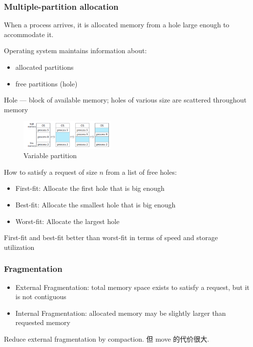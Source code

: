 \subsubsection{Multiple-partition allocation}
When a process arrives, it is allocated memory from a hole large enough to accommodate it. 

Operating system maintains information about:
\begin{itemize}
    \item allocated partitions
    \item free partitions (hole)
\end{itemize}

Hole --- block of available memory; holes of various size are
scattered throughout memory

\begin{figure}[!htb]
    \centering
    \includegraphics[width=0.42\textwidth]{pic/OS8/Variable partition}
    \caption{Variable partition}
\end{figure}

How to satisfy a request of size $n$ from a list of free holes:
\begin{itemize}\small
    \item First-fit: Allocate the first hole that is big enough
    \item Best-fit: Allocate the smallest hole that is big enough
    \item Worst-fit: Allocate the largest hole
\end{itemize}
First-fit and best-fit better than worst-fit in terms of speed and storage utilization

\subsubsection{Fragmentation}
\begin{itemize}
    \item External Fragmentation: total memory space exists to satisfy a
    request, but it is not contiguous
    \item Internal Fragmentation: allocated
    memory may be slightly larger than requested memory
\end{itemize}

Reduce external fragmentation by compaction. 但 move 的代价很大. 

